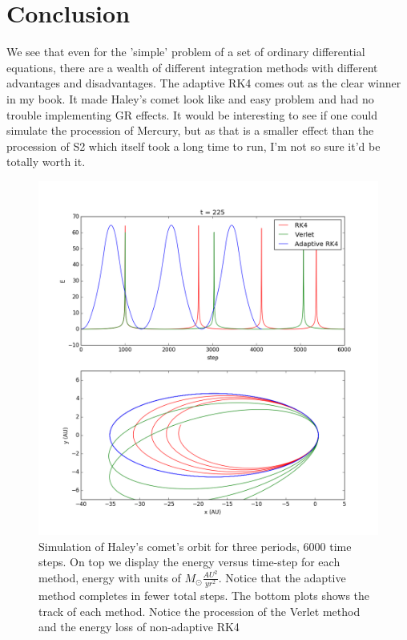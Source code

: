 \documentclass{article}
\begin{document}
\section*{Conclusion}

We see that even for the 'simple' problem of a set of ordinary differential equations, there are a wealth of different integration methods with different advantages and disadvantages. The adaptive RK4 comes out as the clear winner in my book. It made Haley's comet look like and easy problem and had no trouble implementing GR effects. It would be interesting to see if one could simulate the procession of Mercury, but as that is a smaller effect than the procession of S2 which itself took a long time to run, I'm not so sure it'd be totally worth it. 



\begin{figure}[h]
    \includegraphics[width=\textwidth]{halley6000_3.png}
    \caption{Simulation of Haley's comet's orbit for three periods, 6000 time steps. On top we display the energy versus time-step for each method, energy with units of $M_\odot\frac{{AU}^2}{yr^2}$. Notice that the adaptive method completes in fewer total steps. The bottom plots shows the track of each method. Notice the procession of the Verlet method and the energy loss of non-adaptive RK4 }
    \label{fig:halley}
\end{figure}
\end{document}
